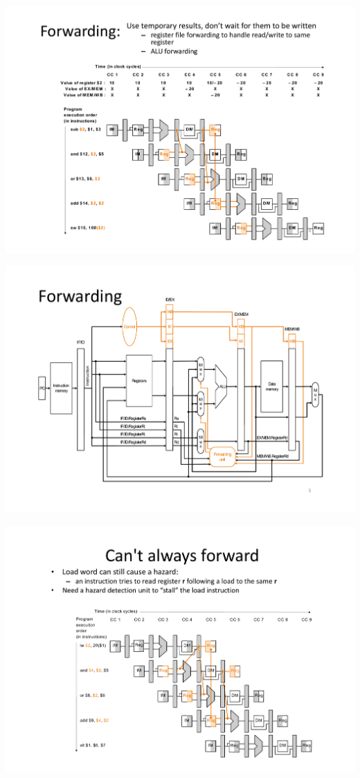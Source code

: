 \begin{center}
  \includegraphics[width=1.0\linewidth]{img/img3/mips3}
\end{center}
\begin{center}
  \includegraphics[width=1.0\linewidth]{img/img3/mips4}
\end{center}
\begin{center}
  \includegraphics[width=1.0\linewidth]{img/img3/mips5}
\end{center}

